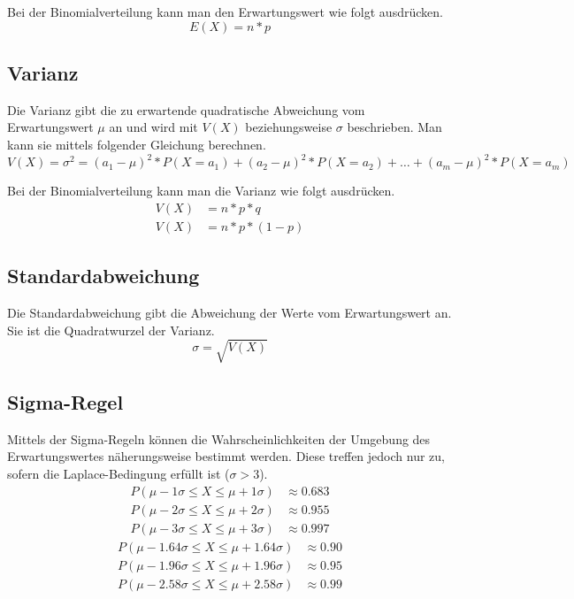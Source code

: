 \documentclass[a4paper]{article}
\begin{document}
			\noindent
			Bei der Binomialverteilung kann man den Erwartungswert wie folgt ausdrücken.
			\begin{equation}
				E(X) = n * p
			\end{equation}
		\subsection{Varianz}
			Die Varianz gibt die zu erwartende quadratische Abweichung vom Erwartungswert $\mu$ an und wird mit $V\left(X\right)$ beziehungsweise $\sigma$ beschrieben. Man kann sie mittels folgender Gleichung berechnen.
			\begin{equation}
				V(X) = \sigma^2 = (a_1 - \mu)^2 * P(X = a_1) + (a_2 - \mu)^2 * P(X = a_2) + \dotsc + (a_m - \mu)^2 * P(X = a_m)
			\end{equation}
			
			\noindent
			Bei der Binomialverteilung kann man die Varianz wie folgt ausdrücken.
			\begin{equation}
				\begin{split}
					V(X) &= n * p * q\\
					V(X) &= n * p * (1-p)
				\end{split}
			\end{equation}
		\subsection{Standardabweichung}
			Die Standardabweichung gibt die Abweichung der Werte vom Erwartungswert an. Sie ist die Quadratwurzel der Varianz.
			\begin{equation}
				\sigma = \sqrt{V(X)}
			\end{equation}
		\subsection{Sigma-Regel}
			Mittels der Sigma-Regeln können die Wahrscheinlichkeiten der Umgebung des Erwartungswertes näherungsweise bestimmt werden. Diese treffen jedoch nur zu, sofern die Laplace-Bedingung erfüllt ist ($\sigma > 3$).
			\begin{subequations}
				\begin{align}
					P(\mu - 1\sigma \leq X \leq \mu + 1\sigma) &\approx 0.683\\
					P(\mu - 2\sigma \leq X \leq \mu + 2\sigma) &\approx 0.955\\
					P(\mu - 3\sigma \leq X \leq \mu + 3\sigma) &\approx 0.997
				\end{align}
			\end{subequations}
			\begin{subequations}
				\begin{align}
				P(\mu - 1.64\sigma \leq X \leq \mu + 1.64\sigma) &\approx 0.90\\
				P(\mu - 1.96\sigma \leq X \leq \mu + 1.96\sigma) &\approx 0.95\\
				P(\mu - 2.58\sigma \leq X \leq \mu + 2.58\sigma) &\approx 0.99
				\end{align}
			\end{subequations}
			
\end{document}
